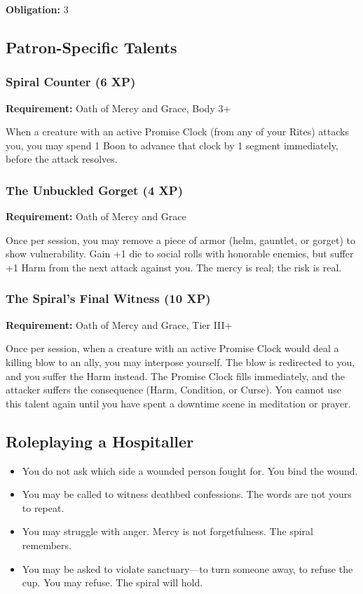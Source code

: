 \textbf{Obligation:} 3

\subsection{Patron-Specific Talents}

\subsubsection{Spiral Counter (6 XP)}

\textbf{Requirement:} Oath of Mercy and Grace, Body 3+

When a creature with an active Promise Clock (from any of your Rites) attacks you, you may spend 1 Boon to advance that clock by 1 segment immediately, before the attack resolves.

\subsubsection{The Unbuckled Gorget (4 XP)}

\textbf{Requirement:} Oath of Mercy and Grace

Once per session, you may remove a piece of armor (helm, gauntlet, or gorget) to show vulnerability. Gain +1 die to social rolls with honorable enemies, but suffer +1 Harm from the next attack against you. The mercy is real; the risk is real.

\subsubsection{The Spiral's Final Witness (10 XP)}

\textbf{Requirement:} Oath of Mercy and Grace, Tier III+

Once per session, when a creature with an active Promise Clock would deal a killing blow to an ally, you may interpose yourself. The blow is redirected to you, and you suffer the Harm instead. The Promise Clock fills immediately, and the attacker suffers the consequence (Harm, Condition, or Curse). You cannot use this talent again until you have spent a downtime scene in meditation or prayer.

\subsection{Roleplaying a Hospitaller}

\begin{itemize}
\item You do not ask which side a wounded person fought for. You bind the wound.
\item You may be called to witness deathbed confessions. The words are not yours to repeat.
\item You may struggle with anger. Mercy is not forgetfulness. The spiral remembers.
\item You may be asked to violate sanctuary—to turn someone away, to refuse the cup. You may refuse. The spiral will hold.
\end{itemize}

